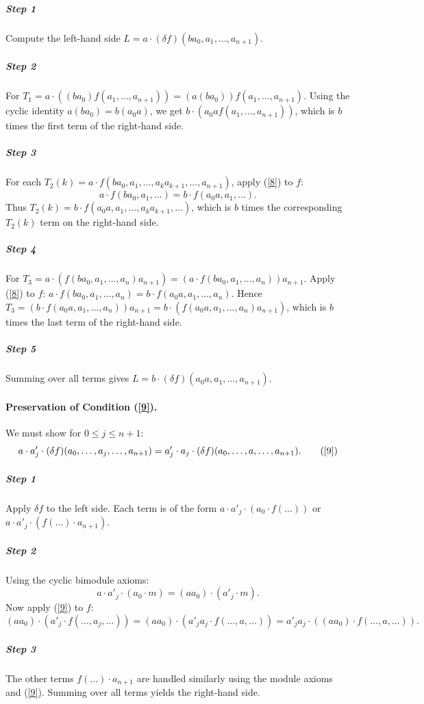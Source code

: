 \documentclass[pdflatex,sn-mathphys-num]{sn-jnl}%
\theoremstyle{thmstyleone}%
\theoremstyle{thmstyletwo}%
\theoremstyle{thmstylethree}%
\begin{document}
\subparagraph{Step 1} Compute the left-hand side $L = a \cdot (\delta f)(b a_0, a_1, \dots, a_{n+1})$.

\subparagraph{Step 2} For $T_1 = a \cdot ((b a_0) f(a_1, \dots, a_{n+1})) = (a(b a_0)) f(a_1, \dots, a_{n+1})$.
Using the cyclic identity $a(b a_0) = b(a_0 a)$, we get $b \cdot (a_0 a f(a_1, \dots, a_{n+1}))$, which is $b$ times the first term of the right-hand side.

\subparagraph{Step 3} For each $T_2(k) = a \cdot f(b a_0, a_1, \dots, a_k a_{k+1}, \dots, a_{n+1})$, apply (\ref{8}) to $f$:
\[
a \cdot f(b a_0, a_1, \dots) = b \cdot f(a_0 a, a_1, \dots).
\]
Thus $T_2(k) = b \cdot f(a_0 a, a_1, \dots, a_k a_{k+1}, \dots)$, which is $b$ times the corresponding $T_2(k)$ term on the right-hand side.

\subparagraph{Step 4} For $T_3 = a \cdot (f(b a_0, a_1, \dots, a_n) a_{n+1}) = (a \cdot f(b a_0, a_1, \dots, a_n)) a_{n+1}$.
Apply (\ref{8}) to $f$: $a \cdot f(b a_0, a_1, \dots, a_n) = b \cdot f(a_0 a, a_1, \dots, a_n)$.
Hence $T_3 = (b \cdot f(a_0 a, a_1, \dots, a_n)) a_{n+1} = b \cdot (f(a_0 a, a_1, \dots, a_n) a_{n+1})$, which is $b$ times the last term of the right-hand side.

\subparagraph{Step 5} Summing over all terms gives $L = b \cdot (\delta f)(a_0 a, a_1, \dots, a_{n+1})$.

\medskip
\paragraph{Preservation of Condition (\ref{9}).}
We must show for $0 \le j \le n+1$:
\[
a \cdot a'_j \cdot (\delta f)(a_0, \dots, a_j, \dots, a_{n+1}) = a'_j \cdot a_j \cdot (\delta f)(a_0, \dots, a, \dots, a_{n+1}). \qquad (\ref{9})
\]

\subparagraph{Step 1} Apply $\delta f$ to the left side. Each term is of the form $a \cdot a'_j \cdot (a_0 \cdot f(\dots))$ or $a \cdot a'_j \cdot (f(\dots) \cdot a_{n+1})$.

\subparagraph{Step 2} Using the cyclic bimodule axioms:
\[
a \cdot a'_j \cdot (a_0 \cdot m) = (a a_0) \cdot (a'_j \cdot m).
\]
Now apply (\ref{9}) to $f$:
\[
(a a_0) \cdot (a'_j \cdot f(\dots, a_j, \dots)) = (a a_0) \cdot (a'_j a_j \cdot f(\dots, a, \dots)) = a'_j a_j \cdot ((a a_0) \cdot f(\dots, a, \dots)).
\]

\subparagraph{Step 3} The other terms $f(\dots) \cdot a_{n+1}$ are handled similarly using the module axioms and (\ref{9}). Summing over all terms yields the right-hand side.
\end{document}
